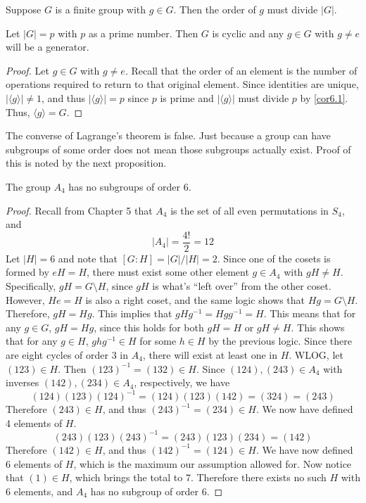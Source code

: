 \documentclass[12pt, letterpaper]{report}
\begin{document}
\begin{corollary}\label{cor6.1}
	Suppose \(G\) is a finite group with \(g\in G\). Then the order of \(g\) must divide \(\vert G \vert \).
\end{corollary}
\begin{corollary}\label{cor6.2}
	Let \(\vert G \vert =p\) with \(p\) as a prime number. Then \(G\) is cyclic and any \(g\in G\) with \(g\neq e\) will be a generator.
\end{corollary}
\begin{proof}
	Let \(g\in G\) with \(g\neq e\). Recall that the order of an element is the number of operations required to return to that original element. Since identities are unique, \(\vert \langle g \rangle   \vert\neq 1 \), and thus \(\vert \langle g \rangle  \vert =p \) since \(p\) is prime and \(\vert \langle g \rangle  \vert \) must divide \(p\) by \ref{cor6.1}. Thus, \(\langle g \rangle =G \).
\end{proof}
\begin{remark}
	The converse of Lagrange's theorem is false. Just because a group can have subgroups of some order does not mean those subgroups actually exist. Proof of this is noted by the next proposition.
\end{remark}
\begin{proposition}
	The group \(A_4\) has no subgroups of order \(6\).
\end{proposition}
\begin{proof}
	Recall from Chapter 5 that \(A_4\) is the set of all even permutations in \(S_4\), and 
	\[
		\left\vert A_4 \right\vert = \frac{4!}{2}=12
	\]
	Let \(\vert H \vert =6\) and note that \([G:H]=\vert G \vert/ \vert H \vert =2  \). Since one of the cosets is formed by \(eH=H\), there must exist some other element \(g\in A_4\) with \(gH \neq H\). Specifically, \(gH=G\setminus H\), since \(gH\) is what's ``left over'' from the other coset. However, \(He=H\) is also a right coset, and the same logic shows that \(Hg=G\setminus H\). Therefore, \(gH=Hg\). This implies that \(gHg^{-1} =Hgg^{-1} =H\). This means that for any \(g\in G\), \(gH=Hg\), since this holds for both \(gH=H\) or \(gH\neq H\). This shows that for any \(g\in H\), \(ghg^{-1} \in H\) for some \(h\in H\) by the previous logic. Since there are eight cycles of order 3 in \(A_4\), there will exist at least one in \(H\). WLOG, let \((123)\in H\). Then \((123)^{-1} =(132) \in H\). Since \((124),(243)\in A_4\) with inverses \((142),(234)\in A_4\), respectively, we have 
	\[
		(124)(123)(124)^{-1} =(124)(123)(142)=(324)=(243)
	\]
	Therefore \((243)\in H\), and thus \((243)^{-1} =(234)\in H\). We now have defined 4 elements of \(H\).
	\[
		(243)(123)(243)^{-1} =(243)(123)(234)=(142)
	\]
	Therefore \((142)\in H\), and thus \((142)^{-1} =(124)\in H\). We have now defined \(6\) elements of \(H\), which is the maximum our assumption allowed for. Now notice that \((1)\in H\), which brings the total to 7. Therefore there exists no such \(H\) with 6 elements, and \(A_4\) has no subgroup of order 6.
\end{proof}
\end{document}
